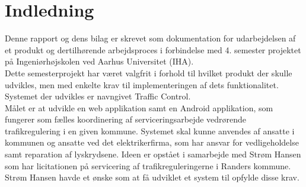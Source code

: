\chapter{Indledning}
Denne rapport og dens bilag er skrevet som dokumentation for udarbejdelsen af et produkt
og dertilhørende arbejdsproces i forbindelse med 4. semester projektet på Ingeniørhøjskolen
ved Aarhus Universitet (IHA).\\
Dette semesterprojekt har været valgfrit i forhold til hvilket produkt der skulle udvikles, men med
enkelte krav til implementeringen af dets funktionalitet.\\
Systemet der udvikles er navngivet Traffic Control.\\
\newline
Målet er at udvikle en web applikation samt en Android applikation, som fungerer som fælles koordinering af serviceringsarbejde vedrørende trafikregulering i en given kommune. Systemet skal kunne anvendes af ansatte i kommunen og ansatte ved det elektrikerfirma, som har ansvar for vedligeholdelse samt reparation af lyskrydsene.
\newline
Ideen er opstået i samarbejde med Strøm Hansen som har licitationen på servicering af trafikreguleringerne i Randers kommune. Strøm Hansen havde et ønske som at få udviklet et system til opfylde disse krav.
\newline 



